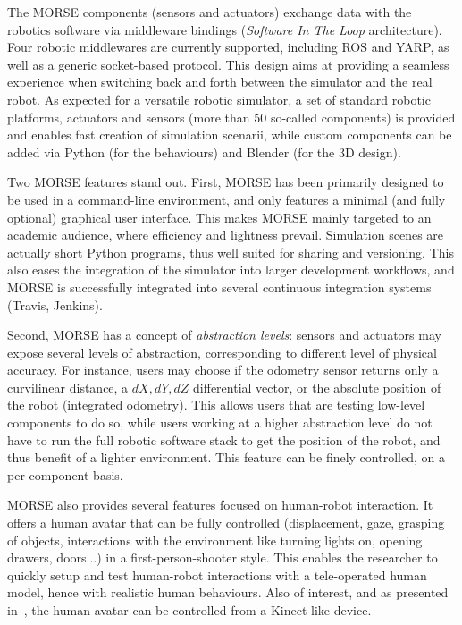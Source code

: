 \documentclass[conference]{IEEEtran}
\begin{document}
The MORSE components (sensors and actuators) exchange data with the robotics
software via middleware bindings (\emph{Software In The Loop} architecture).
Four robotic middlewares are currently supported, including ROS and YARP, as
well as a generic socket-based protocol. This design aims at providing a
seamless experience when switching back and forth between the simulator and the
real robot. As expected for a versatile robotic simulator, a set of standard
robotic platforms, actuators and sensors (more than 50 so-called components) is
provided and enables fast creation of simulation scenarii, while custom
components can be added via Python (for the behaviours) and Blender (for the 3D
design).

Two MORSE features stand out. First, MORSE has been primarily designed to be
used in a command-line environment, and only features a minimal (and fully
optional) graphical user interface. This makes MORSE mainly targeted to an
academic audience, where efficiency and lightness prevail.  Simulation scenes
are actually short Python programs, thus well suited for sharing and versioning.
This also eases the integration of the simulator into larger development
workflows, and MORSE is successfully integrated into several continuous
integration systems (Travis, Jenkins).

Second, MORSE has a concept of \emph{abstraction levels}: sensors and actuators may
expose several levels of abstraction, corresponding to different level of
physical accuracy. For instance, users may choose if the odometry sensor returns
only a curvilinear distance, a $dX, dY, dZ$ differential vector, or the absolute
position of the robot (integrated odometry). This allows users that are testing
low-level components to do so, while users working at a higher abstraction level
do not have to run the full robotic software stack to get the position of the
robot, and thus benefit of a lighter environment. This feature can be finely
controlled, on a per-component basis.

MORSE also provides several features focused on human-robot interaction. It
offers a human avatar that can be fully controlled (displacement, gaze, grasping
of objects, interactions with the environment like turning lights on, opening
drawers, doors...) in a first-person-shooter style. This enables the researcher
to quickly setup and test human-robot interactions with a tele-operated human
model, hence with realistic human behaviours. Also of interest, and as presented
in~\cite{lemaignan2012morse}, the human avatar can be controlled from a
Kinect-like device.
\end{document}
